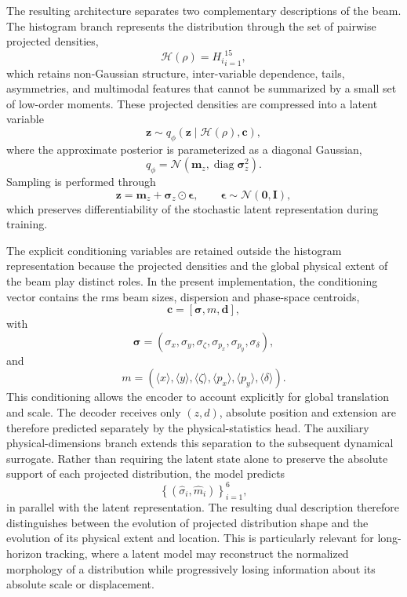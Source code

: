 The resulting architecture separates two complementary descriptions of the beam. The histogram branch represents the distribution through the set of pairwise projected densities,
\[
\mathcal{H}(\rho)
=
{H_i}_{i=1}^{15},
\]
which retains non-Gaussian structure, inter-variable dependence, tails, asymmetries, and multimodal features that cannot be summarized by a small set of low-order moments. These projected densities are compressed into a latent variable
\[
\mathbf{z}
\sim
q_{\phi}
\left(
\mathbf{z}
\mid
\mathcal{H}(\rho),\mathbf{c}
\right),
\]
where the approximate posterior is parameterized as a diagonal Gaussian,
\[
q_{\phi}
=
\mathcal{N}
\!\left(
\boldsymbol{m}_{z},
\operatorname{diag}
\boldsymbol{\sigma}_{z}^{2}
\right).
\]
Sampling is performed through
\[
\mathbf{z}
=
\boldsymbol{m}_{z}
+
\boldsymbol{\sigma}_{z}
\odot
\boldsymbol{\epsilon},
\qquad
\boldsymbol{\epsilon}
\sim
\mathcal{N}(\mathbf{0},\mathbf{I}),
\]
which preserves differentiability of the stochastic latent
representation during training.

The explicit conditioning variables are retained outside the histogram representation because the projected densities and the global physical extent of the beam play distinct roles. In the present implementation, the conditioning vector contains the rms beam sizes, dispersion and phase-space centroids,
\[
\mathbf{c}
=
\left[
\boldsymbol{\sigma},
m,
\mathbf{d}
\right],
\]
with
\[
\boldsymbol{\sigma}
=
\left(
\sigma_x,
\sigma_y,
\sigma_{\zeta},
\sigma_{p_x},
\sigma_{p_y},
\sigma_{\delta}
\right),
\]
and
\[
m
=
\left(
\langle x\rangle,
\langle y\rangle,
\langle\zeta\rangle,
\langle p_x\rangle,
\langle p_y\rangle,
\langle\delta\rangle
\right).
\]
This conditioning allows the encoder to account explicitly for global translation and scale. The decoder receives only \((z,d)\), absolute position and extension are therefore predicted separately by the physical-statistics head. The auxiliary physical-dimensions branch extends this separation to the subsequent dynamical surrogate. Rather than requiring the latent state alone to preserve the absolute support of each projected distribution, the model predicts
\[
\left\{
(\widehat{\sigma}_{i},
\widehat{m}_{i})
\right\}_{i=1}^{6},
\]
in parallel with the latent representation. The resulting dual
description therefore distinguishes between the evolution of projected distribution shape and the evolution of its physical extent and location. This is particularly relevant for long-horizon tracking, where a latent model may reconstruct the normalized morphology of a distribution while progressively losing information about its absolute scale or displacement.


